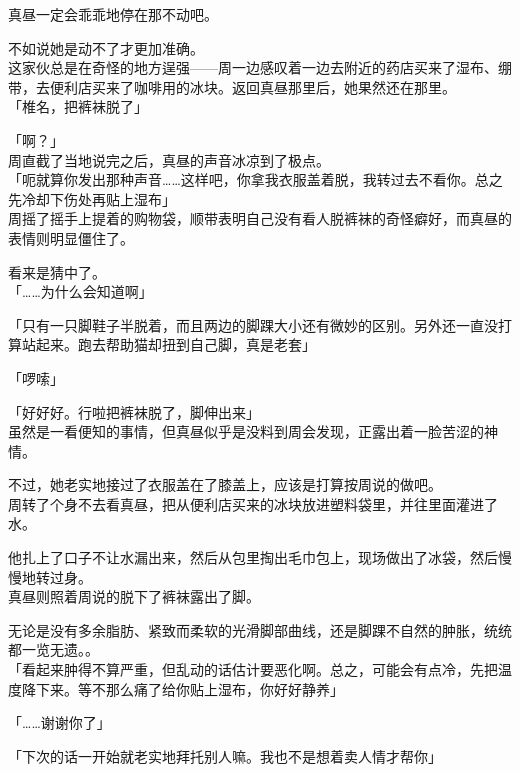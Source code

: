真昼一定会乖乖地停在那不动吧。

不如说她是动不了才更加准确。\\

这家伙总是在奇怪的地方逞强——周一边感叹着一边去附近的药店买来了湿布、绷带，去便利店买来了咖啡用的冰块。返回真昼那里后，她果然还在那里。\\

「椎名，把裤袜脱了」

「啊？」\\

周直截了当地说完之后，真昼的声音冰凉到了极点。\\

「呃就算你发出那种声音……这样吧，你拿我衣服盖着脱，我转过去不看你。总之先冷却下伤处再贴上湿布」\\

周摇了摇手上提着的购物袋，顺带表明自己没有看人脱裤袜的奇怪癖好，而真昼的表情则明显僵住了。

看来是猜中了。\\

「……为什么会知道啊」

「只有一只脚鞋子半脱着，而且两边的脚踝大小还有微妙的区别。另外还一直没打算站起来。跑去帮助猫却扭到自己脚，真是老套」

「啰嗦」

「好好好。行啦把裤袜脱了，脚伸出来」\\

虽然是一看便知的事情，但真昼似乎是没料到周会发现，正露出着一脸苦涩的神情。

不过，她老实地接过了衣服盖在了膝盖上，应该是打算按周说的做吧。\\

周转了个身不去看真昼，把从便利店买来的冰块放进塑料袋里，并往里面灌进了水。

他扎上了口子不让水漏出来，然后从包里掏出毛巾包上，现场做出了冰袋，然后慢慢地转过身。\\

真昼则照着周说的脱下了裤袜露出了脚。

无论是没有多余脂肪、紧致而柔软的光滑脚部曲线，还是脚踝不自然的肿胀，统统都一览无遗。。\\

「看起来肿得不算严重，但乱动的话估计要恶化啊。总之，可能会有点冷，先把温度降下来。等不那么痛了给你贴上湿布，你好好静养」

「……谢谢你了」

「下次的话一开始就老实地拜托别人嘛。我也不是想着卖人情才帮你」\\

